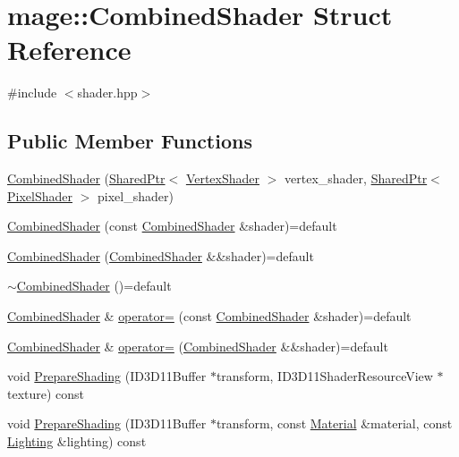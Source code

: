 \hypertarget{structmage_1_1_combined_shader}{}\section{mage\+:\+:Combined\+Shader Struct Reference}
\label{structmage_1_1_combined_shader}


{\ttfamily \#include $<$shader.\+hpp$>$}

\subsection*{Public Member Functions}
\begin{DoxyCompactItemize}
\item 
\hyperlink{structmage_1_1_combined_shader_ab9d6ce4dc9ed2602b19729ee8d126f61}{Combined\+Shader} (\hyperlink{namespacemage_a1e01ae66713838a7a67d30e44c67703e}{Shared\+Ptr}$<$ \hyperlink{classmage_1_1_vertex_shader}{Vertex\+Shader} $>$ vertex\+\_\+shader, \hyperlink{namespacemage_a1e01ae66713838a7a67d30e44c67703e}{Shared\+Ptr}$<$ \hyperlink{classmage_1_1_pixel_shader}{Pixel\+Shader} $>$ pixel\+\_\+shader)
\item 
\hyperlink{structmage_1_1_combined_shader_afc4a237b78efe6b13d6e569ede301b62}{Combined\+Shader} (const \hyperlink{structmage_1_1_combined_shader}{Combined\+Shader} \&shader)=default
\item 
\hyperlink{structmage_1_1_combined_shader_a74c1a44f6b1ec3cc1734b18b337441d3}{Combined\+Shader} (\hyperlink{structmage_1_1_combined_shader}{Combined\+Shader} \&\&shader)=default
\item 
\hyperlink{structmage_1_1_combined_shader_a6b1767d2525724f2f9120df87253973e}{$\sim$\+Combined\+Shader} ()=default
\item 
\hyperlink{structmage_1_1_combined_shader}{Combined\+Shader} \& \hyperlink{structmage_1_1_combined_shader_a14859fb597c07309fd269b56af373c02}{operator=} (const \hyperlink{structmage_1_1_combined_shader}{Combined\+Shader} \&shader)=default
\item 
\hyperlink{structmage_1_1_combined_shader}{Combined\+Shader} \& \hyperlink{structmage_1_1_combined_shader_ad05cf0e2c4f0cd7d37ad5be971aefd1b}{operator=} (\hyperlink{structmage_1_1_combined_shader}{Combined\+Shader} \&\&shader)=default
\item 
void \hyperlink{structmage_1_1_combined_shader_a5eb9372fd492ab61b9b536ca47ce5176}{Prepare\+Shading} (I\+D3\+D11\+Buffer $\ast$transform, I\+D3\+D11\+Shader\+Resource\+View $\ast$texture) const
\item 
void \hyperlink{structmage_1_1_combined_shader_a87c880670df95efb7f26d963e8fefd37}{Prepare\+Shading} (I\+D3\+D11\+Buffer $\ast$transform, const \hyperlink{structmage_1_1_material}{Material} \&material, const \hyperlink{structmage_1_1_lighting}{Lighting} \&lighting) const
\end{DoxyCompactItemize}
